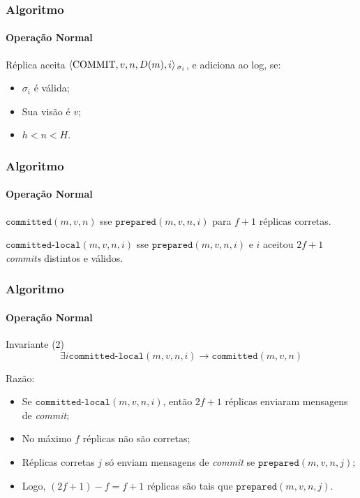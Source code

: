 \documentclass{beamer}
\begin{document}
\begin{frame}
  \frametitle{Algoritmo}
  \framesubtitle{Operação Normal}

  Réplica aceita $\braket{\text{COMMIT}, v, n, D(m), i}{}_{\sigma_i}$, e adiciona ao log, se:
  \begin{itemize}
    \item
      $\sigma_i$ é válida;

    \item
      Sua visão é $v$;

    \item
      $h < n < H$.
  \end{itemize}
\end{frame}

\begin{frame}
  \frametitle{Algoritmo}
  \framesubtitle{Operação Normal}

  $\texttt{committed}(m, v, n)$ sse $\texttt{prepared}(m, v, n, i)$ para $f + 1$ réplicas corretas.

  \hspace{1.5pt}

  $\texttt{committed-local}(m, v, n, i)$ sse $\texttt{prepared}(m, v, n, i)$ e $i$ aceitou $2f + 1$ \textit{commits} distintos e válidos.
\end{frame}

\begin{frame}
  \frametitle{Algoritmo}
  \framesubtitle{Operação Normal}

  \begin{block}{Invariante (2)}
    $$\exists i \texttt{committed-local}(m, v, n, i) \to \texttt{committed}(m, v, n)$$
  \end{block}

  Razão:
  \begin{itemize}
      \pause
    \item
      Se $\texttt{committed-local}(m, v, n, i)$, então $2f + 1$ réplicas enviaram mensagens de \textit{commit};

      \pause
    \item
      No máximo $f$ réplicas não são corretas;

      \pause
    \item
      Réplicas corretas $j$ só enviam mensagens de \textit{commit} se $\texttt{prepared}(m, v, n, j)$;

      \pause
    \item
      Logo, $(2f + 1) - f = f + 1$ réplicas são tais que $\texttt{prepared}(m, v, n, j)$.
  \end{itemize}
\end{frame}
\end{document}
